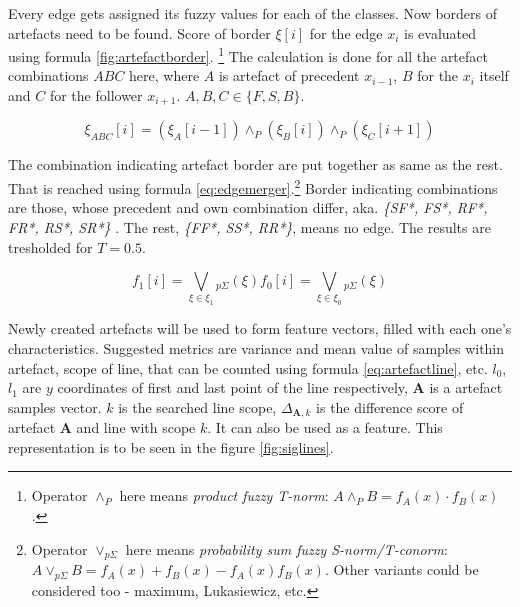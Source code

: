 Every edge gets assigned its fuzzy values for each of the classes. Now borders of artefacts need to be found.
Score of border $\xi[i]$ for the edge $x_i$ is evaluated using formula \ref{fig:artefactborder}.
\footnote{Operator $\land_P$ here means {\it product fuzzy T-norm}: $A \land_P B = f_A(x)\cdot f_B(x)$.}
The calculation is done for all the artefact combinations $ABC$ here, where $A$ is artefact of precedent $x_{i-1}$, $B$ for the
$x_i$ itself and $C$ for the follower $x_{i+1}$. $A,B,C \in \{F,S,B\}$.

\begin{equation}
\xi_{ABC}[i] = (\xi_{A}[i-1]) \land_P (\xi_{B}[i]) \land_P (\xi_{C}[i+1])
\label{fig:artefactborder}
\end{equation}

The combination indicating artefact border are put together as same as the rest. That is reached
using formula \ref{eq:edgemerger}.\footnote{Operator $\lor_{p\Sigma}$ here means
{\it probability sum fuzzy S-norm/T-conorm}: $A \lor_{p\Sigma} B = f_A(x) + f_B(x) - f_A(x)f_B(x)$.
Other variants could be considered too - maximum, Lukasiewicz, etc. } Border indicating
combinations are those, whose precedent and own combination differ, aka. {\it \{SF*, FS*, RF*, FR*, RS*, SR*\} }.
The rest, {\it \{FF*, SS*, RR*\}}, means no edge. The results are tresholded for $T = 0.5$.

\begin{subequations}
\begin{equation}
f_{1}[i] = \bigvee\limits_{\xi \in \xi_1}{}_{p\Sigma} (\xi)
\end{equation}
\begin{equation}
f_{0}[i] = \bigvee\limits_{\xi \in \xi_0}{}_{p\Sigma} (\xi)
\end{equation}
\label{eq:edgemerger}
\end{subequations}


Newly created artefacts will be used to form feature vectors, filled with each one's characteristics.
Suggested metrics are variance and mean value of samples within artefact, scope of line, that 
can be counted using formula \ref{eq:artefactline}, etc.
$l_0$, $l_1$ are $y$ coordinates of first and last point of the line respectively,
\textbf{A} is a artefact samples vector. $k$ is the searched line scope,
$\Delta_{\textbf{A},k}$ is the difference score of artefact \textbf{A} and line with scope
$k$. It can also be used as a feature. This representation is to be seen in the figure \ref{fig:siglines}.

